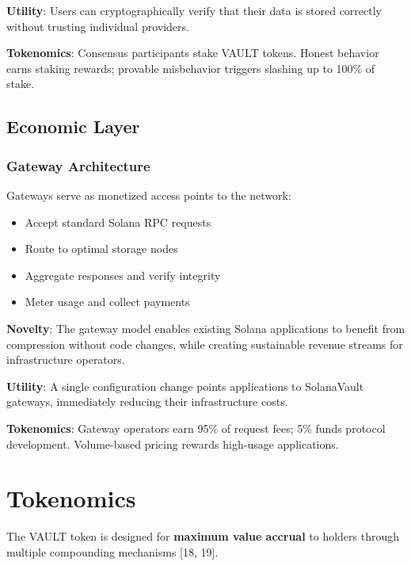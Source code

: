 \documentclass[12pt,a4paper]{article}
\begin{document}
\noindent\textbf{Utility}: Users can cryptographically verify that their data is stored correctly without trusting individual providers.

\noindent\textbf{Tokenomics}: Consensus participants stake VAULT tokens. Honest behavior earns staking rewards; provable misbehavior triggers slashing up to 100\% of stake.

\subsection{Economic Layer}

\subsubsection{Gateway Architecture}

Gateways serve as monetized access points to the network:

\begin{itemize}
    \item Accept standard Solana RPC requests
    \item Route to optimal storage nodes
    \item Aggregate responses and verify integrity
    \item Meter usage and collect payments
\end{itemize}

\noindent\textbf{Novelty}: The gateway model enables existing Solana applications to benefit from compression without code changes, while creating sustainable revenue streams for infrastructure operators.

\noindent\textbf{Utility}: A single configuration change points applications to SolanaVault gateways, immediately reducing their infrastructure costs.

\noindent\textbf{Tokenomics}: Gateway operators earn 95\% of request fees; 5\% funds protocol development. Volume-based pricing rewards high-usage applications.

\section{Tokenomics}

The VAULT token is designed for \textbf{maximum value accrual} to holders through multiple compounding mechanisms [18, 19].
\end{document}
